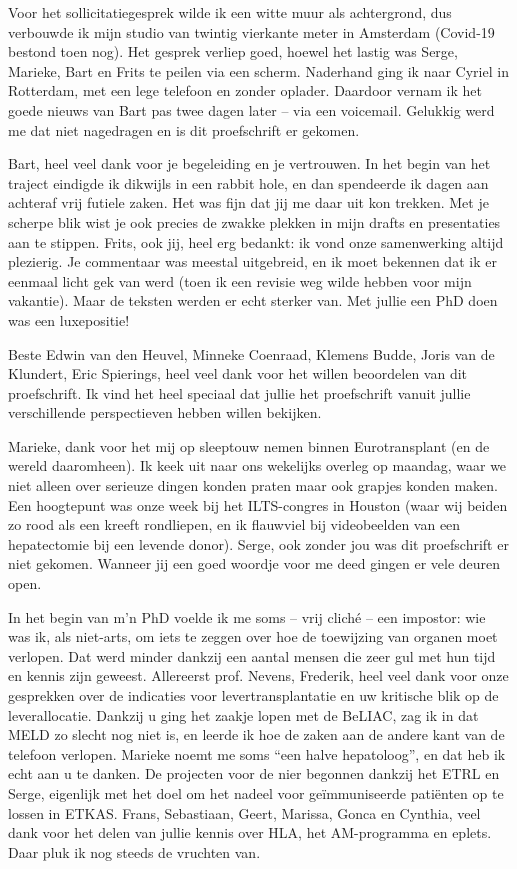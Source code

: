 \documentclass[11pt,twoside,]{book}
\begin{document}
Voor het sollicitatiegesprek wilde ik een witte muur als achtergrond,
dus verbouwde ik mijn studio van twintig vierkante meter in Amsterdam (Covid-19
bestond toen nog). Het gesprek verliep goed, hoewel
het lastig was Serge, Marieke, Bart en Frits te peilen via een scherm. Naderhand
ging ik naar Cyriel in Rotterdam, met een lege telefoon en zonder oplader. Daardoor
vernam ik het goede nieuws van Bart pas twee dagen later -- via een voicemail.
Gelukkig werd me dat niet nagedragen en is dit proefschrift er gekomen.

Bart, heel veel dank voor je begeleiding en je vertrouwen. In het begin van het
traject eindigde ik dikwijls in een rabbit hole, en dan spendeerde ik dagen aan
achteraf vrij futiele zaken. Het was fijn dat jij me daar uit kon trekken. Met je
scherpe blik wist je ook precies de zwakke plekken in mijn drafts en presentaties
aan te stippen. Frits, ook jij, heel erg bedankt: ik vond onze samenwerking
altijd plezierig. Je commentaar was meestal uitgebreid, en ik moet bekennen dat ik er
eenmaal licht gek van werd (toen ik een revisie weg wilde hebben voor mijn vakantie).
Maar de teksten werden er echt sterker van. Met jullie een PhD doen was een luxepositie!

Beste Edwin van den Heuvel, Minneke Coenraad, Klemens Budde, Joris van de Klundert,
Eric Spierings, heel veel dank voor het willen beoordelen van dit proefschrift.
Ik vind het heel speciaal dat jullie het proefschrift vanuit jullie verschillende
perspectieven hebben willen bekijken.

\newpage

Marieke, dank voor het mij op sleeptouw nemen binnen Eurotransplant (en de wereld daaromheen).
Ik keek uit naar ons wekelijks overleg op maandag, waar we niet alleen over serieuze
dingen konden praten maar ook grapjes konden maken. Een hoogtepunt was onze
week bij het ILTS-congres in Houston (waar wij beiden zo rood als een kreeft rondliepen,
en ik flauwviel bij videobeelden van een hepatectomie bij een levende donor).
Serge, ook zonder jou was dit proefschrift er niet gekomen. Wanneer jij een goed
woordje voor me deed gingen er vele deuren open.

In het begin van m'n PhD voelde ik me soms -- vrij cliché -- een impostor: wie was ik, als niet-arts, om iets te zeggen over hoe de toewijzing van organen moet verlopen.
Dat werd minder dankzij een
aantal mensen die zeer gul met hun tijd en kennis zijn geweest. Allereerst prof.
Nevens, Frederik, heel veel dank voor onze gesprekken over de indicaties voor
levertransplantatie en uw kritische blik op de leverallocatie. Dankzij u ging het
zaakje lopen met de BeLIAC, zag ik in dat MELD zo slecht nog niet is, en leerde
ik hoe de zaken aan de andere kant van de telefoon verlopen.
Marieke noemt me soms ``een halve hepatoloog'', en dat heb ik echt aan u te danken.
De projecten voor de nier begonnen dankzij het ETRL en Serge, eigenlijk met
het doel om het nadeel voor geïmmuniseerde patiënten op te lossen in ETKAS.
Frans, Sebastiaan, Geert, Marissa, Gonca en Cynthia, veel dank voor het delen van jullie
kennis over HLA, het AM-programma en eplets. Daar pluk ik nog steeds
de vruchten van.
\end{document}
